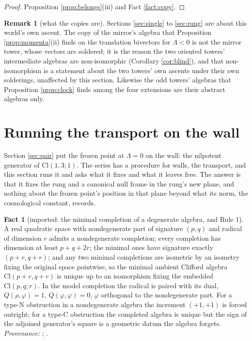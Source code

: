 \documentclass[11pt]{article}
\theoremstyle{definition}
\newtheorem{remark}[theorem]{Remark}
\newtheorem{fact}[theorem]{Fact}
\newcommand{\Cl}{\mathrm{Cl}}
\begin{document}
\begin{proof}
Proposition \ref{prop:belongs}(iii) and Fact \ref{fact:copy}.
\end{proof}

\begin{remark}[what the copies are]\label{rem:copies}
Sections \ref{sec:single} to \ref{sec:rung} are about this world's own ascent. The copy of the mirror's algebra that Proposition \ref{prop:momenta}(ii) finds on the translation bivectors for $\Lambda < 0$ is not the mirror tower, whose vectors are soldered; it is the reason the two oriented towers' intermediate algebras are non-isomorphic (Corollary \ref{cor:blind}), and that non-isomorphism is a statement about the two towers' own ascents under their own solderings, unaffected by this section. Likewise the odd towers' algebras that Proposition \ref{prop:clock} finds among the four extensions are their abstract algebras only.
\end{remark}

\section{Running the transport on the wall}\label{sec:run}

Section \ref{sec:pair} put the frozen point at $\Lambda = 0$ on the wall: the nilpotent generator of $\Cl(1,3;1)$. The series has a procedure for walls, the transport, and this section runs it and asks what it fixes and what it leaves free. The answer is that it fixes the rung and a canonical null frame in the rung's new plane, and nothing about the frozen point's position in that plane beyond what its norm, the cosmological constant, records.

\begin{fact}[imported: the minimal completion of a degenerate algebra, and Rule 1]\label{fact:completion}
A real quadratic space with nondegenerate part of signature $(p,q)$ and radical of dimension $r$ admits a nondegenerate completion; every completion has dimension at least $p + q + 2r$; the minimal ones have signature exactly $(p+r, q+r)$; and any two minimal completions are isometric by an isometry fixing the original space pointwise, so the minimal ambient Clifford algebra $\Cl(p+r, q+r)$ is unique up to an isomorphism fixing the embedded $\Cl(p,q;r)$. In the model completion the radical is paired with its dual, $Q(\rho, \varphi) = 1$, $Q(\varphi,\varphi) = 0$, $\varphi$ orthogonal to the nondegenerate part. For a type-N obstruction in a nondegenerate algebra the increment $(+1,+1)$ is forced outright; for a type-C obstruction the completed algebra is unique but the sign of the adjoined generator's square is a geometric datum the algebra forgets. \emph{Provenance:} \cite[Thm.~2.3 and its model]{ButlerT2}; \cite[Thm.~4.13, Thm.~5.7 and Rem.~5.8]{ButlerT1}.
\end{fact}
\end{document}
